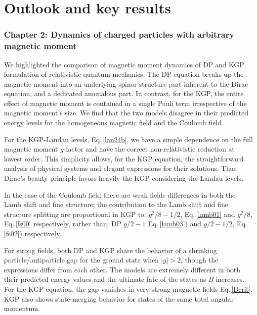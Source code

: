 \chapter{Outlook and key results}
\label{chap:outlook}

\subsection*{Chapter 2: Dynamics of charged particles with arbitrary magnetic moment}
\label{sec:chap2}
We highlighted the comparison of magnetic moment dynamics of DP and KGP formulation of relativistic quantum mechanics. The DP equation breaks up the magnetic moment into an underlying spinor structure part inherent to the Dirac equation, and a dedicated anomalous part. In contrast, for the KGP, the entire effect of magnetic moment is contained in a single Pauli term irrespective of the magnetic moment\rq s size. We find that the two models disagree in their predicted energy levels for the homogeneous magnetic field and the Coulomb field.

For the KGP-Landau levels, Eq.\,\eqref{lan24b}, we have a simple dependence on the full magnetic moment $g$-factor and have the correct non-relativistic reduction at lowest order. This simplicity allows, for the KGP equation, the straightforward analysis of physical systems and elegant expressions for their solutions. Thus Dirac's beauty principle favors heavily the KGP considering the Landau levels.

In the case of the Coulomb field there are weak fields differences in both the Lamb shift and fine structure; the contribution to the Lamb shift and fine structure splitting are proportional in KGP to: $g^{2}/8-1/2$, Eq.\,\eqref{lamb01} and $g^{2}/8$, Eq.\,\eqref{fs00} respectively, rather than: DP $g/2-1$ Eq.\,\eqref{lamb03}) and $g/2-1/2$, Eq.\,\eqref{fs02}) respectively.

For strong fields, both DP and KGP share the behavior of a shrinking particle/antiparticle gap for the ground state when $|g|>2$, though the expressions differ from each other. The models are extremely different in both their predicted energy values and the ultimate fate of the states as $B$ increases. For the KGP equation, the gap vanishes in very strong magnetic fields Eq.\,\eqref{Bcrit}. KGP also shows state-merging behavior for states of the same total angular momentum.

